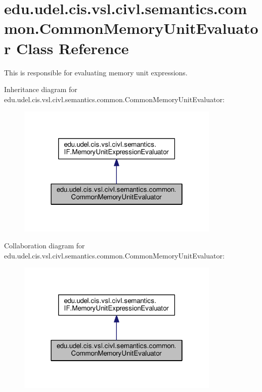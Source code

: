 \hypertarget{classedu_1_1udel_1_1cis_1_1vsl_1_1civl_1_1semantics_1_1common_1_1CommonMemoryUnitEvaluator}{}\section{edu.\+udel.\+cis.\+vsl.\+civl.\+semantics.\+common.\+Common\+Memory\+Unit\+Evaluator Class Reference}
\label{classedu_1_1udel_1_1cis_1_1vsl_1_1civl_1_1semantics_1_1common_1_1CommonMemoryUnitEvaluator}


This is responsible for evaluating memory unit expressions.  




Inheritance diagram for edu.\+udel.\+cis.\+vsl.\+civl.\+semantics.\+common.\+Common\+Memory\+Unit\+Evaluator\+:
\nopagebreak
\begin{figure}[H]
\begin{center}
\leavevmode
\includegraphics[width=274pt]{classedu_1_1udel_1_1cis_1_1vsl_1_1civl_1_1semantics_1_1common_1_1CommonMemoryUnitEvaluator__inherit__graph}
\end{center}
\end{figure}


Collaboration diagram for edu.\+udel.\+cis.\+vsl.\+civl.\+semantics.\+common.\+Common\+Memory\+Unit\+Evaluator\+:
\nopagebreak
\begin{figure}[H]
\begin{center}
\leavevmode
\includegraphics[width=274pt]{classedu_1_1udel_1_1cis_1_1vsl_1_1civl_1_1semantics_1_1common_1_1CommonMemoryUnitEvaluator__coll__graph}
\end{center}
\end{figure}
